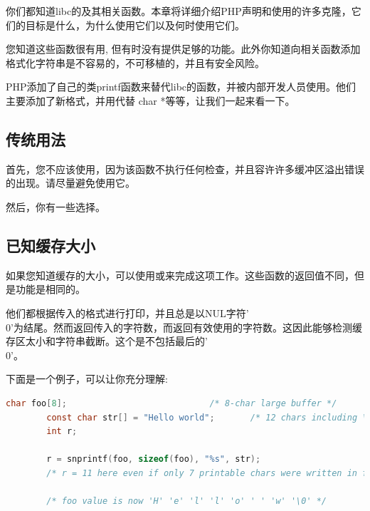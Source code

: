 你们都知道libc的及其相关函数。本章将详细介绍PHP声明和使用的许多克隆，它们的目标是什么，为什么使用它们以及何时使用它们。



您知道这些函数很有用, 但有时没有提供足够的功能。此外你知道向相关函数添加格式化字符串是不容易的，不可移植的，并且有安全风险。

PHP添加了自己的类printf函数来替代libc的函数，并被内部开发人员使用。他们主要添加了新格式，并用代替 char *等等，让我们一起来看一下。



\subsection{传统用法}

首先，您不应该使用，因为该函数不执行任何检查，并且容许许多缓冲区溢出错误的出现。请尽量避免使用它。


然后，你有一些选择。

\subsection{已知缓存大小}

如果您知道缓存的大小，可以使用或来完成这项工作。这些函数的返回值不同，但是功能是相同的。

他们都根据传入的格式进行打印，并且总是以NUL字符'\\0'为结尾。然而返回传入的字符数，而返回有效使用的字符数。这因此能够检测缓存区太小和字符串截断。这个是不包括最后的'\\0'。


下面是一个例子，可以让你充分理解:

\begin{lstlisting}[language=c]
        char foo[8];                            /* 8-char large buffer */
        const char str[] = "Hello world";       /* 12 chars including \0 in count */
        int r;

        r = snprintf(foo, sizeof(foo), "%s", str);
        /* r = 11 here even if only 7 printable chars were written in foo */

        /* foo value is now 'H' 'e' 'l' 'l' 'o' ' ' 'w' '\0' */
\end{lstlisting}  


